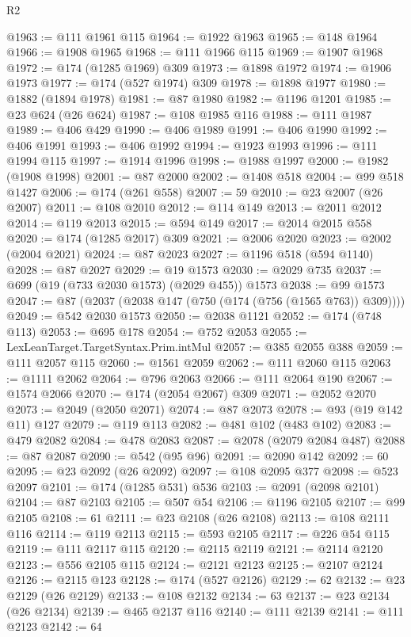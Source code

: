 \begin{lexlean}{R2}
\begin{coremodule}
{{{{{{{{{{{{{{{{{{{{{{{{{{{{{{{{{{{{{{{{{{{{{{{{{{{{{{{{{{{{{{{{{{{{{{{{{{{{{{{{{{{{{{{{{{{{{{{{{{{{{{{{{{{{{{{{{{{{{{{{{{{{{{{{{{{{{{{{{{{{@1963 := @111 @1961 @115
@1964 := @1922 @1963
@1965 := @148 @1964
@1966 := @1908 @1965
@1968 := @111 @1966 @115
@1969 := @1907 @1968
@1972 := @174 (@1285 @1969) @309
@1973 := @1898 @1972
@1974 := @1906 @1973
@1977 := @174 (@527 @1974) @309
@1978 := @1898 @1977
@1980 := @1882 (@1894 @1978)
@1981 := @87 @1980
@1982 := @1196 @1201
@1985 := @23 @624 (@26 @624)
@1987 := @108 @1985 @116
@1988 := @111 @1987
@1989 := @406 @429
@1990 := @406 @1989
@1991 := @406 @1990
@1992 := @406 @1991
@1993 := @406 @1992
@1994 := @1923 @1993
@1996 := @111 @1994 @115
@1997 := @1914 @1996
@1998 := @1988 @1997
@2000 := @1982 (@1908 @1998)
@2001 := @87 @2000
@2002 := @1408 @518
@2004 := @99 @518 @1427
@2006 := @174 (@261 @558)
@2007 := 59
@2010 := @23 @2007 (@26 @2007)
@2011 := @108 @2010
@2012 := @114 @149
@2013 := @2011 @2012
@2014 := @119 @2013
@2015 := @594 @149
@2017 := @2014 @2015 @558
@2020 := @174 (@1285 @2017) @309
@2021 := @2006 @2020
@2023 := @2002 (@2004 @2021)
@2024 := @87 @2023
@2027 := @1196 @518 (@594 @1140)
@2028 := @87 @2027
@2029 := @19 @1573
@2030 := @2029 @735
@2037 := @699 (@19 (@733 @2030 @1573) (@2029 @455)) @1573
@2038 := @99 @1573
@2047 := @87 (@2037 (@2038 @147 (@750 (@174 (@756 (@1565 @763)) @309))))
@2049 := @542 @2030 @1573
@2050 := @2038 @1121
@2052 := @174 (@748 @113)
@2053 := @695 @178
@2054 := @752 @2053
@2055 := LexLeanTarget.TargetSyntax.Prim.intMul
@2057 := @385 @2055 @388
@2059 := @111 @2057 @115
@2060 := @1561 @2059
@2062 := @111 @2060 @115
@2063 := @1111 @2062
@2064 := @796 @2063
@2066 := @111 @2064 @190
@2067 := @1574 @2066
@2070 := @174 (@2054 @2067) @309
@2071 := @2052 @2070
@2073 := @2049 (@2050 @2071)
@2074 := @87 @2073
@2078 := @93 (@19 @142 @11) @127
@2079 := @119 @113
@2082 := @481 @102 (@483 @102)
@2083 := @479 @2082
@2084 := @478 @2083
@2087 := @2078 (@2079 @2084 @487)
@2088 := @87 @2087
@2090 := @542 (@95 @96)
@2091 := @2090 @142
@2092 := 60
@2095 := @23 @2092 (@26 @2092)
@2097 := @108 @2095 @377
@2098 := @523 @2097
@2101 := @174 (@1285 @531) @536
@2103 := @2091 (@2098 @2101)
@2104 := @87 @2103
@2105 := @507 @54
@2106 := @1196 @2105
@2107 := @99 @2105
@2108 := 61
@2111 := @23 @2108 (@26 @2108)
@2113 := @108 @2111 @116
@2114 := @119 @2113
@2115 := @593 @2105
@2117 := @226 @54 @115
@2119 := @111 @2117 @115
@2120 := @2115 @2119
@2121 := @2114 @2120
@2123 := @556 @2105 @115
@2124 := @2121 @2123
@2125 := @2107 @2124
@2126 := @2115 @123
@2128 := @174 (@527 @2126)
@2129 := 62
@2132 := @23 @2129 (@26 @2129)
@2133 := @108 @2132
@2134 := 63
@2137 := @23 @2134 (@26 @2134)
@2139 := @465 @2137 @116
@2140 := @111 @2139
@2141 := @111 @2123
@2142 := 64
}}}}}}}}}}}}}}}}}}}}}}}}}}}}}}}}}}}}}}}}}}}}}}}}}}}}}}}}}}}}}}}}}}}}}}}}}}}}}}}}}}}}}}}}}}}}}}}}}}}}}}}}}}}}}}}}}}}}}}}}}}}}}}}}}}}}}}}}}}}}
\end{coremodule}
\end{lexlean}

